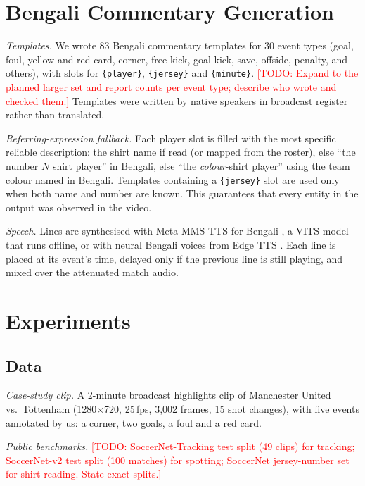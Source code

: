 \documentclass[conference]{IEEEtran}
\newcommand{\todo}[1]{\textcolor{red}{[TODO: #1]}}
\begin{document}
\section{Bengali Commentary Generation}
\label{sec:generation}

\textit{Templates.} We wrote 83 Bengali commentary templates for 30 event types (goal, foul, yellow and red card, corner, free kick, goal kick, save, offside, penalty, and others), with slots for \texttt{\{player\}}, \texttt{\{jersey\}} and \texttt{\{minute\}}. \todo{Expand to the planned larger set and report counts per event type; describe who wrote and checked them.} Templates were written by native speakers in broadcast register rather than translated.

\textit{Referring-expression fallback.} Each player slot is filled with the most specific reliable description: the shirt name if read (or mapped from the roster), else ``the number $N$ shirt player'' in Bengali, else ``the \emph{colour}-shirt player'' using the team colour named in Bengali. Templates containing a \texttt{\{jersey\}} slot are used only when both name and number are known. This guarantees that every entity in the output was observed in the video.

\textit{Speech.} Lines are synthesised with Meta MMS-TTS for Bengali \cite{pratap2024scaling}, a VITS model \cite{kim2021conditional} that runs offline, or with neural Bengali voices from Edge TTS \cite{edge_tts_2024}. Each line is placed at its event's time, delayed only if the previous line is still playing, and mixed over the attenuated match audio.

\section{Experiments}

\subsection{Data}
\textit{Case-study clip.} A 2-minute broadcast highlights clip of Manchester United vs.\ Tottenham (1280$\times$720, 25\,fps, 3{,}002 frames, 15 shot changes), with five events annotated by us: a corner, two goals, a foul and a red card.

\textit{Public benchmarks.} \todo{SoccerNet-Tracking test split (49 clips) for tracking; SoccerNet-v2 test split (100 matches) for spotting; SoccerNet jersey-number set for shirt reading. State exact splits.}
\end{document}
